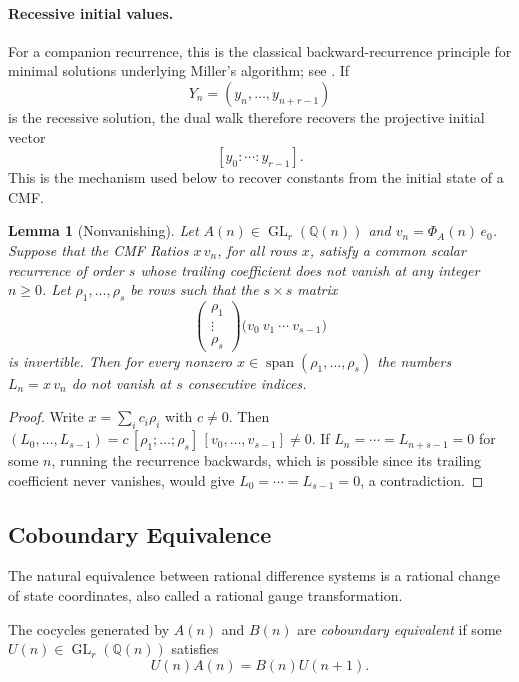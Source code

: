 \documentclass[oneside,english,11pt]{amsart}
\newtheorem{lemma}[thm]{Lemma}
\begin{document}
\paragraph{Recessive initial values.}
\label{sec:initial-value-limit-principle}
For a companion recurrence, this is the classical backward-recurrence
principle for minimal solutions underlying Miller's algorithm; see
\cite{gautschi1967computational,zahar1977mathematical}.
If
\[
    Y_n=(y_n,\ldots,y_{n+r-1})
\]
is the recessive solution, the dual walk therefore recovers the
projective initial vector
\[
    [y_0:\cdots:y_{r-1}].
\]
This is the mechanism used below to recover constants from the initial
state of a CMF.

\begin{lemma}[Nonvanishing]
\label{lem:nonvanishing}
Let $A(n)\in \operatorname{GL}_r(\mathbb Q (n))$ and $v_n=\Phi_A(n)\,e_0$. Suppose that the CMF Ratios $x\,v_n$, for all rows
$x$, satisfy a common scalar recurrence of order $s$ whose trailing
coefficient does not vanish at any integer $n\ge0$. Let
$\rho_1,\ldots,\rho_s$ be rows such that the $s\times s$ matrix
\[
  \begin{pmatrix}\rho_1\\\vdots\\\rho_s\end{pmatrix}
  \bigl(v_0\ v_1\ \cdots\ v_{s-1}\bigr)
\]
is invertible. Then for every nonzero $x\in\operatorname{span}(\rho_1,\ldots,\rho_s)$
the numbers $L_n=x\,v_n$ do not vanish at $s$ consecutive indices.
\end{lemma}

\begin{proof}
Write $x=\sum_ic_i\rho_i$ with $c\ne0$. Then
$(L_0,\ldots,L_{s-1})=c\,[\rho_1;\ldots;\rho_s]\,[v_0,\ldots,v_{s-1}]\ne0$.
If $L_n=\cdots=L_{n+s-1}=0$ for some $n$, running the recurrence backwards,
which is possible since its trailing coefficient never vanishes, would
give $L_0=\cdots=L_{s-1}=0$, a contradiction.
\end{proof}

\subsection{Coboundary Equivalence}
\label{subsec:coboundary}

The natural equivalence between rational difference systems is a
rational change of state coordinates, also called a rational gauge
transformation.

\begin{defn}
\label{def:coboundary}
The cocycles generated by $A(n)$ and $B(n)$ are
\emph{coboundary equivalent} if some
$U(n)\in\operatorname{GL}_r(\mathbb Q(n))$ satisfies
\[
    U(n)A(n)=B(n)U(n+1).
\]
\end{defn}
\end{document}
